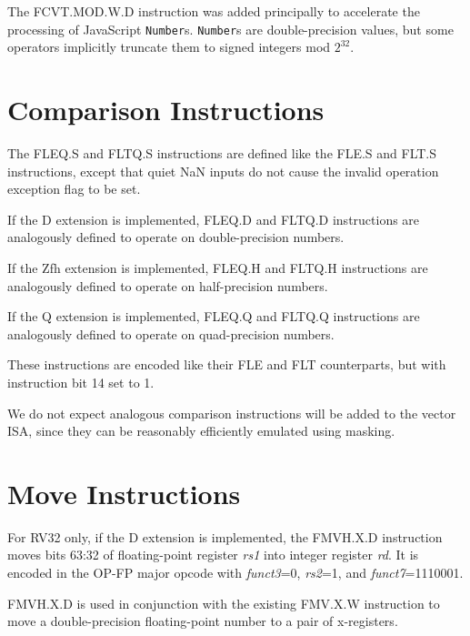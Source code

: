\begin{commentary}
The FCVT.MOD.W.D instruction was added principally to accelerate the
processing of JavaScript {\tt Number}s.
{\tt Number}s are double-precision values, but some operators implicitly
truncate them to signed integers mod $2^{32}$.
\end{commentary}

\section{Comparison Instructions}

The FLEQ.S and FLTQ.S instructions are defined like the FLE.S and FLT.S
instructions, except that quiet NaN inputs do not cause the invalid
operation exception flag to be set.

If the D extension is implemented, FLEQ.D and FLTQ.D instructions are
analogously defined to operate on double-precision numbers.

If the Zfh extension is implemented, FLEQ.H and FLTQ.H instructions are
analogously defined to operate on half-precision numbers.

If the Q extension is implemented, FLEQ.Q and FLTQ.Q instructions are
analogously defined to operate on quad-precision numbers.

These instructions are encoded like their FLE and FLT counterparts, but
with instruction bit 14 set to 1.

\begin{commentary}
We do not expect analogous comparison instructions will be added to the vector
ISA, since they can be reasonably efficiently emulated using masking.
\end{commentary}


\section{Move Instructions}

For RV32 only, if the D extension is implemented,
the FMVH.X.D instruction moves bits 63:32 of floating-point register {\em rs1}
into integer register {\em rd}.
It is encoded in the OP-FP major opcode with {\em funct3}=0, {\em rs2}=1,
and {\em funct7}=1110001.

\begin{commentary}
FMVH.X.D is used in conjunction with the existing FMV.X.W instruction to move
a double-precision floating-point number to a pair of x-registers.
\end{commentary}

